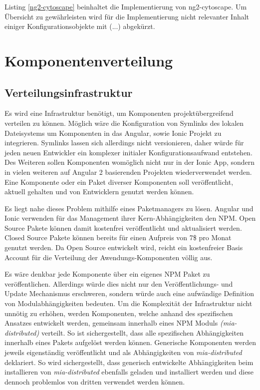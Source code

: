 

Listing \ref{ng2-cytoscape} beinhaltet die Implementierung von ng2-cytoscape.
Um Übersicht zu gewährleisten wird für die Implementierung nicht relevanter Inhalt einiger Konfigurationsobjekte mit (...) abgekürzt.


\newpage
\section{Komponentenverteilung}

\subsection{Verteilungsinfrastruktur}

Es wird eine Infrastruktur benötigt, um Komponenten projektübergreifend verteilen zu können.
Möglich wäre die Konfiguration von Symlinks des lokalen Dateisystems um Komponenten in das Angular,
sowie Ionic Projekt zu integrieren. Symlinks lassen sich allerdings nicht versionieren, daher würde
für jeden neuen Entwickler ein komplexer initialer Konfigurationsaufwand entstehen.
Des Weiteren sollen Komponenten womöglich nicht nur in der Ionic App,
sondern in vielen weiteren auf Angular 2 basierenden Projekten wiederverwendet werden.
Eine Komponente oder ein Paket diverser Komponenten soll veröffentlicht, aktuell
gehalten und von Entwicklern genutzt werden können.

Es liegt nahe dieses Problem mithilfe eines Paketmanagers zu lösen. Angular und Ionic verwenden für das Management
ihrer Kern-Abhängigkeiten den \ac{NPM}.
Open Source Pakete können damit kostenfrei veröffentlicht und aktualisiert werden. Closed Source Pakete können
bereits für einen Aufpreis von 7\$ pro Monat genutzt werden.
Da \projectname{} Open Source entwickelt wird,
reicht ein kostenfreier Basis Account für die Verteilung der Awendungs-Komponenten völlig aus.

Es wäre denkbar jede Komponente über ein eigenes \ac{NPM} Paket zu veröffentlichen.
Allerdings würde dies nicht nur den Veröffentlichungs- und Update Mechanismus erschweren,
sondern würde auch eine aufwändige Definition von Modulabhängigkeiten bedeuten.
Um die Komplexität der Infrastruktur nicht unnötig zu erhöhen,
werden Komponenten, welche anhand des spezifischen Ansatzes entwickelt werden,
gemeinsam innerhalb eines \ac{NPM} Moduls \emph{(mia-distributed)} verteilt.
So ist sichergestellt, dass alle spezifischen Abhängigkeiten innerhalb eines Pakets aufgelöst werden können.
Generische Komponenten werden jeweils eigenständig veröffentlicht und als Abhängigkeiten von \emph {mia-distributed} deklariert.
So wird sichergestellt, dass generisch entwickelte Abhängigkeiten beim installieren von \emph{mia-distributed}
ebenfalls geladen und installiert werden und diese dennoch problemlos von dritten verwendet werden können.

